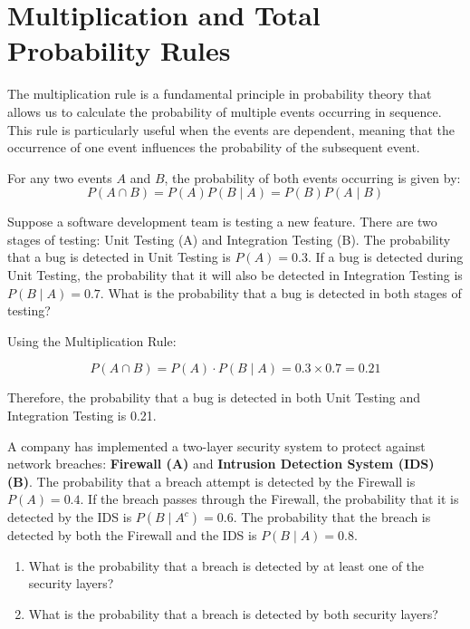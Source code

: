 \section{Multiplication and Total Probability Rules}
The multiplication rule is a fundamental principle in probability theory that allows us to calculate the probability of multiple events occurring in sequence. This rule is particularly useful when the events are dependent, meaning that the occurrence of one event influences the probability of the subsequent event.

\begin{theorem}
    For any two events \( A \) and \( B \), the probability of both events occurring is given by:
    \[
    P(A \cap B) = P(A) P(B \mid A) = P(B) P(A \mid B)
    \]
\end{theorem}

\begin{example}
    Suppose a software development team is testing a new feature. There are two stages of testing: Unit Testing (A) and Integration Testing (B). The probability that a bug is detected in Unit Testing is $P(A)=0.3$. If a bug is detected during Unit Testing, the probability that it will also be detected in Integration Testing is $P(B \mid A) = 0.7$. What is the probability that a bug is detected in both stages of testing?
\end{example}

\begin{solution}
    Using the Multiplication Rule:

\[
P(A \cap B)=P(A) \cdot P(B \mid A)=0.3 \times 0.7=0.21
\]


Therefore, the probability that a bug is detected in both Unit Testing and Integration Testing is 0.21.
\end{solution}

\begin{example}
A company has implemented a two-layer security system to protect against network breaches: \textbf{Firewall (A)} and \textbf{Intrusion Detection System (IDS) (B)}. The probability that a breach attempt is detected by the Firewall is \( P(A) = 0.4 \). If the breach passes through the Firewall, the probability that it is detected by the IDS is \( P(B \mid A^c) = 0.6 \). The probability that the breach is detected by both the Firewall and the IDS is \( P(B \mid A) = 0.8 \).

\begin{enumerate}[label=(\alph*)]
    \item What is the probability that a breach is detected by at least one of the security layers?
    \item What is the probability that a breach is detected by both security layers?
\end{enumerate}

\end{example}

